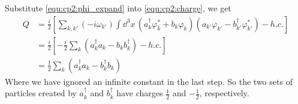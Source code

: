 \begin{problembody}
    \item Substitute \eqref{equ:cp2:phi_expand} into \eqref{equ:cp2:charge}, we get
    \begin{align}\label{equ:cp2:charge_diag}
        Q & = \frac{i}{2} \left[\sum_{k, k'} (-i\omega_{k'})
        \int \dd^3x \, \left(a^\dagger_k\varphi^\ast_k + b_k\varphi_k\right)
        \left(a_{k'} \varphi_{k'} - b^\dagger_{k'}\varphi^\ast_{k'}\right) - h.c.\right]\nonumber\\
        & = \frac{i}{2} \left[-\frac{i}{2} \sum_k \left(a^\dagger_k a_k - b_k b^\dagger_k\right) - h.c.\right]\nonumber\\
        & = \frac{1}{2} \sum_k \left(a^\dagger_k a_k - b^\dagger_k b_k\right)
    \end{align}
    Where we have ignored an infinite constant in the last step. So the two sets of particles created by $a^\dagger_k$ and $b^\dagger_k$ have charges
    $\frac{1}{2}$ and $-\frac{1}{2}$, respectively.


\end{problembody}
